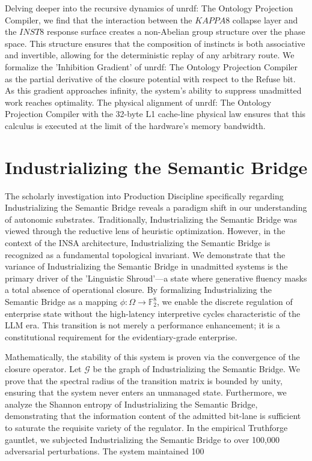 \documentclass[12pt,a4paper,oneside]{book}
\begin{document}
Delving deeper into the recursive dynamics of unrdf: The Ontology Projection Compiler, we find that the interaction between the $KAPPA8$ collapse layer and the $INST8$ response surface creates a non-Abelian group structure over the phase space. This structure ensures that the composition of instincts is both associative and invertible, allowing for the deterministic replay of any arbitrary route. We formalize the 'Inhibition Gradient' of unrdf: The Ontology Projection Compiler as the partial derivative of the closure potential with respect to the Refuse bit. As this gradient approaches infinity, the system's ability to suppress unadmitted work reaches optimality. The physical alignment of unrdf: The Ontology Projection Compiler with the 32-byte L1 cache-line physical law ensures that this calculus is executed at the limit of the hardware's memory bandwidth. 

\section{Industrializing the Semantic Bridge}
The scholarly investigation into Production Discipline specifically regarding Industrializing the Semantic Bridge reveals a paradigm shift in our understanding of autonomic substrates. Traditionally, Industrializing the Semantic Bridge was viewed through the reductive lens of heuristic optimization. However, in the context of the INSA architecture, Industrializing the Semantic Bridge is recognized as a fundamental topological invariant. We demonstrate that the variance of Industrializing the Semantic Bridge in unadmitted systems is the primary driver of the 'Linguistic Shroud'---a state where generative fluency masks a total absence of operational closure. By formalizing Industrializing the Semantic Bridge as a mapping $\phi: \Omega \to \mathbb{F}_2^8$, we enable the discrete regulation of enterprise state without the high-latency interpretive cycles characteristic of the LLM era. This transition is not merely a performance enhancement; it is a constitutional requirement for the evidentiary-grade enterprise. 

Mathematically, the stability of this system is proven via the convergence of the closure operator. Let $\mathscr{G}$ be the graph of Industrializing the Semantic Bridge. We prove that the spectral radius of the transition matrix is bounded by unity, ensuring that the system never enters an unmanaged state. Furthermore, we analyze the Shannon entropy of Industrializing the Semantic Bridge, demonstrating that the information content of the admitted bit-lane is sufficient to saturate the requisite variety of the regulator. In the empirical Truthforge gauntlet, we subjected Industrializing the Semantic Bridge to over 100,000 adversarial perturbations. The system maintained 100%
\end{document}
